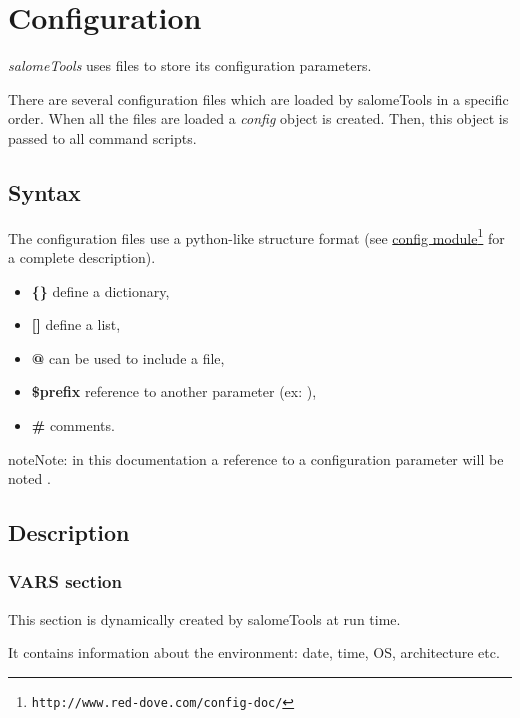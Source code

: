 \documentclass[a4paper,10pt,english]{sphinxmanual}
\begin{document}
\section{Configuration}
\label{configuration:configuration}\label{configuration::doc}
\emph{salomeTools} uses files to store its configuration parameters.

There are several configuration files which are loaded by salomeTools in a specific order.
When all the files are loaded a \emph{config} object is created.
Then, this object is passed to all command scripts.


\subsection{Syntax}
\label{configuration:syntax}
The configuration files use a python-like structure format
(see \href{http://www.red-dove.com/config-doc/}{config module}\footnote[3]{\sphinxAtStartFootnote%
\nolinkurl{http://www.red-dove.com/config-doc/}
} for a complete description).
\begin{itemize}
\item {} 
\textbf{\{\}} define a dictionary,

\item {} 
\textbf{{[}{]}} define a list,

\item {} 
\textbf{@} can be used to include a file,

\item {} 
\textbf{\$prefix} reference to another parameter (ex: ),

\item {} 
\textbf{\#} comments.

\end{itemize}

\begin{notice}{note}{Note:}
in this documentation a reference to a configuration parameter will be noted .
\end{notice}


\subsection{Description}
\label{configuration:description}

\subsubsection{VARS section}
\label{configuration:vars-section}\label{configuration:id1}
\begin{DUlineblock}{0em}
\item[] This section is dynamically created by salomeTools at run time.
\item[] It contains information about the environment: date, time, OS, architecture etc.
\end{DUlineblock}
\end{document}
